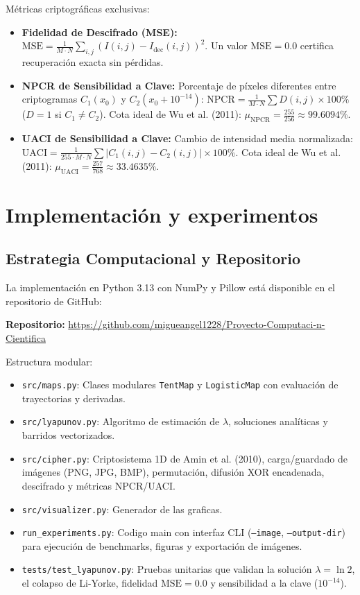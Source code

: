 \documentclass[11pt,letterpaper]{article}
\begin{document}
Métricas criptográficas exclusivas:
\begin{itemize}
    \item \textbf{Fidelidad de Descifrado (MSE):} $\text{MSE} = \frac{1}{M \cdot N} \sum_{i,j} (I(i, j) - I_{\text{dec}}(i, j))^2$. Un valor $\text{MSE} = 0.0$ certifica recuperación exacta sin pérdidas.
    \item \textbf{NPCR de Sensibilidad a Clave:} Porcentaje de píxeles diferentes entre criptogramas $C_1(x_0)$ y $C_2(x_0 + 10^{-14})$: $\text{NPCR} = \frac{1}{M \cdot N} \sum D(i, j) \times 100\%$ ($D=1$ si $C_1 \neq C_2$). Cota ideal de Wu et al. (2011): $\mu_{\text{NPCR}} = \frac{255}{256} \approx 99.6094\%$.
    \item \textbf{UACI de Sensibilidad a Clave:} Cambio de intensidad media normalizada: $\text{UACI} = \frac{1}{255 \cdot M \cdot N} \sum |C_1(i, j) - C_2(i, j)| \times 100\%$. Cota ideal de Wu et al. (2011): $\mu_{\text{UACI}} = \frac{257}{768} \approx 33.4635\%$.
\end{itemize}

\section{Implementación y experimentos}

\subsection{Estrategia Computacional y Repositorio}
La implementación en Python 3.13 con NumPy y Pillow está disponible en el repositorio de GitHub:
\begin{center}
    \textbf{Repositorio:} \url{https://github.com/migueangel1228/Proyecto-Computaci-n-Cientifica}
\end{center}

Estructura modular:
\begin{itemize}
    \item \texttt{src/maps.py}: Clases modulares \texttt{TentMap} y \texttt{LogisticMap} con evaluación de trayectorias y derivadas.
    \item \texttt{src/lyapunov.py}: Algoritmo de estimación de $\lambda$, soluciones analíticas y barridos vectorizados.
    \item \texttt{src/cipher.py}: Criptosistema 1D de Amin et al. (2010), carga/guardado de imágenes (PNG, JPG, BMP), permutación, difusión XOR encadenada, descifrado y métricas NPCR/UACI.
    \item \texttt{src/visualizer.py}: Generador de las graficas.
    \item \texttt{run\_experiments.py}: Codigo main con interfaz CLI (\texttt{--image}, \texttt{--output-dir}) para ejecución de benchmarks, figuras y exportación de imágenes.
    \item \texttt{tests/test\_lyapunov.py}: Pruebas unitarias que validan la solución $\lambda = \ln 2$, el colapso de Li-Yorke, fidelidad $\text{MSE}=0.0$ y sensibilidad a la clave ($10^{-14}$).
\end{itemize}
\end{document}
